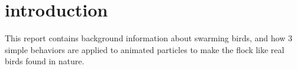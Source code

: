 \section{introduction}
This report contains background information about swarming birds, and how 3 simple behaviors are applied to animated particles to make the flock like real birds found in nature.
